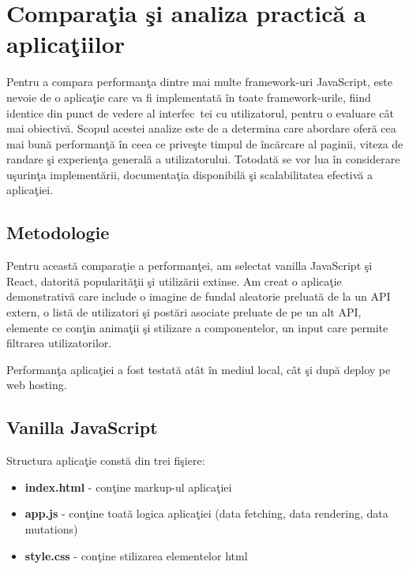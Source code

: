 \documentclass[12pt, a4paper]{report}
\begin{document}
\section{Compara\c tia \c si analiza practic\u a a aplica\c tiilor}

Pentru a compara performan\c ta dintre mai multe framework-uri JavaScript, este nevoie de o aplica\c tie care va fi implementat\u a \^in toate framework-urile, fiind identice din punct de vedere al interfec\ tei cu utilizatorul, pentru o evaluare c\^at mai obiectiv\u a. Scopul acestei analize este de a determina care abordare ofer\u a cea mai bun\u a performan\c t\u a \^in ceea ce prive\c ste timpul de \^inc\u arcare al paginii, viteza de randare \c si experien\c ta general\u a a utilizatorului. Totodat\u a se vor lua \^in considerare u\c surin\c ta implement\u arii, documenta\c tia disponibil\u a \c si scalabilitatea efectiv\u a a aplica\c tiei.

\subsection{Metodologie}

Pentru aceast\u a compara\c tie a performan\c tei, am selectat vanilla JavaScript \c si React, datorit\u a popularit\u a\c tii \c si utiliz\u arii extinse. Am creat o aplica\c tie demonstrativ\u a care include o imagine de fundal aleatorie preluat\u a de la un API extern, o list\u a de utilizatori \c si post\u ari asociate preluate de pe un alt API, elemente ce con\c tin anima\c tii \c si stilizare a componentelor, un input care permite filtrarea utilizatorilor.

Performan\c ta aplica\c tiei a fost testat\u a at\^at \^in mediul local, c\^at \c si dup\u a deploy pe web hosting.

\subsection{Vanilla JavaScript}
Structura aplica\c tie const\u a din trei fi\c siere:
\begin{itemize}
	\item \textbf{index.html} - con\c tine markup-ul aplica\c tiei
	\item \textbf{app.js} - con\c tine toat\u a logica aplica\c tiei (data fetching, data rendering, data mutations)
	\item \textbf{style.css} - con\c tine stilizarea elementelor html
\end{itemize}
\end{document}
